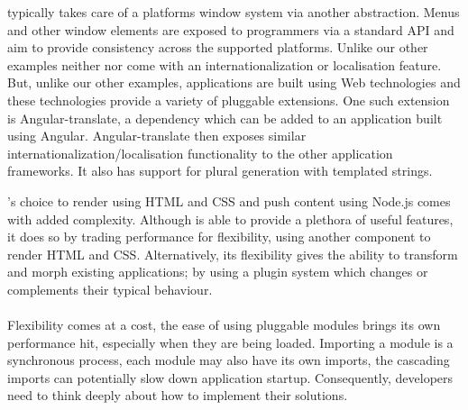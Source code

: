    typically takes care of a platforms window system via another abstraction. Menus\cite{electron_menu} and other window elements are exposed to programmers via a standard API and aim to provide consistency across the supported platforms.
  Unlike our other examples neither  nor  come with an internationalization or localisation feature. But, unlike our other examples,  applications are built using Web technologies and these technologies provide a variety of pluggable extensions. One such extension is Angular-translate, a dependency which can be added to an application built using Angular\cite{angular_translate}. Angular-translate then exposes similar internationalization/localisation functionality to the other application frameworks. It also has support for plural generation with templated strings.

  's choice to render using HTML and CSS and push content using Node.js comes with added complexity. Although  is able to provide a plethora of useful features, it does so by trading performance for flexibility, using another component to render HTML and CSS. Alternatively, its flexibility gives the ability to transform and morph existing  applications; by using a plugin system which changes or complements their typical behaviour.\\\\
  Flexibility comes at a cost, the ease of using pluggable modules brings its own performance hit, especially when they are being loaded. Importing a module is a synchronous process, each module may also have its own imports, the cascading imports can potentially slow down application startup. Consequently, developers need to think deeply about how to implement their solutions.


